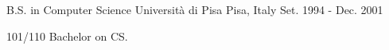 

\begin{cventries}

  \cventry
    {B.S. in Computer Science} %
    {Università di Pisa} %
    {Pisa, Italy} %
    {Set. 1994 - Dec. 2001} %
    {
      \begin{cvitems}
        \item {101/110 Bachelor on CS.}
      \end{cvitems}
    }

\end{cventries}